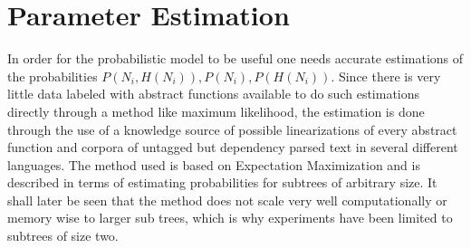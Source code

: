 \section{Parameter Estimation}
In order for the probabilistic model to be useful one needs accurate estimations of the probabilities $P(N_i,H(N_i)), P(N_i),P(H(N_i))$. Since there is very little data labeled with abstract functions available to do such estimations directly through a method like maximum likelihood, the estimation is done through the use of a knowledge source of possible linearizations of every abstract function and corpora of untagged but dependency parsed text in several different languages. The method used is based on Expectation Maximization and is described in terms of estimating probabilities for subtrees of arbitrary size. It shall later be seen that the method does not scale very well computationally or memory wise to larger sub trees, which is why experiments have been limited to subtrees of size two. %

